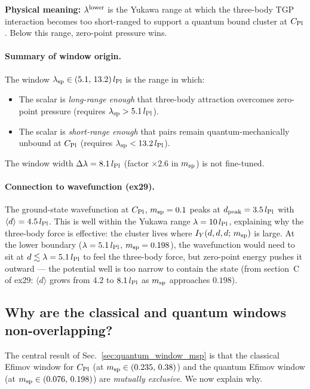 \textbf{Physical meaning:} $\lambda^{\rm lower}$ is the Yukawa range at which
the three-body TGP interaction becomes too short-ranged to support a
quantum bound cluster at $C_{\rm Pl}$.  Below this range, zero-point
pressure wins.

\paragraph{Summary of window origin.}
The window $\lambda_{\rm sp}\in(5.1,\,13.2)\,l_{\rm Pl}$ is the range
in which:
\begin{itemize}
\item The scalar is \emph{long-range enough} that three-body attraction
  overcomes zero-point pressure (requires $\lambda_{\rm sp}>5.1\,l_{\rm Pl}$).
\item The scalar is \emph{short-range enough} that pairs remain
  quantum-mechanically unbound at $C_{\rm Pl}$
  (requires $\lambda_{\rm sp}<13.2\,l_{\rm Pl}$).
\end{itemize}
The window width $\Delta\lambda = 8.1\,l_{\rm Pl}$ (factor $\times2.6$ in
$m_{\rm sp}$) is not fine-tuned.

\paragraph{Connection to wavefunction (ex29).}
The ground-state wavefunction at $C_{\rm Pl}$, $m_{\rm sp}=0.1$ peaks at
$d_{\rm peak}=3.5\,l_{\rm Pl}$ with $\langle d\rangle=4.5\,l_{\rm Pl}$.
This is well within the Yukawa range $\lambda=10\,l_{\rm Pl}$, explaining
why the three-body force is effective: the cluster lives where
$I_Y(d,d,d;\,m_{\rm sp})$ is large.  At the lower boundary
($\lambda=5.1\,l_{\rm Pl}$, $m_{\rm sp}=0.198$), the wavefunction would need
to sit at $d\lesssim\lambda=5.1\,l_{\rm Pl}$ to feel the three-body force,
but zero-point energy pushes it outward — the potential well is too narrow
to contain the state (from section~C of ex29: $\langle d\rangle$ grows
from $4.2$ to $8.1\,l_{\rm Pl}$ as $m_{\rm sp}$ approaches $0.198$).

\subsection{Why are the classical and quantum windows non-overlapping?}
\label{sec:nonoverlap}

The central result of Sec.~\ref{sec:quantum_window_msp} is that the
classical Efimov window for $C_{\rm Pl}$ (at $m_{\rm sp}\in(0.235,\,0.38)$)
and the quantum Efimov window (at $m_{\rm sp}\in(0.076,\,0.198)$) are
\emph{mutually exclusive}.  We now explain why.

